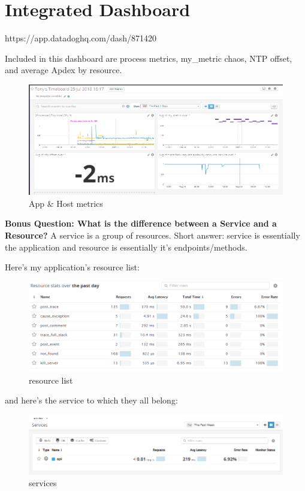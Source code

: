 \documentclass[11pt]{article}
\makeatletter
\def\maxwidth{\ifdim\Gin@nat@width>\linewidth\linewidth
    \else\Gin@nat@width\fi}
\let\Oldincludegraphics\includegraphics
\renewcommand{\includegraphics}[1]{\Oldincludegraphics[width=.8\maxwidth]{#1}}
\makeatother
\begin{document}
    \section{Integrated Dashboard}\label{integrated-dashboard}

    https://app.datadoghq.com/dash/871420

Included in this dashboard are process metrics, my\_metric chaos, NTP
offset, and average Apdex by resource.

\begin{figure}
\centering
\includegraphics{images/hostandapp.PNG}
\caption{App \& Host metrics}
\end{figure}

\textbf{Bonus Question: What is the difference between a Service and a
Resource?} A service is a group of resources. Short answer: service is
essentially the application and resource is essentially it's
endpoints/methods.

Here's my application's resource list:

\begin{figure}
\centering
\includegraphics{images/resources.png}
\caption{resource list}
\end{figure}

and here's the service to which they all belong:

\begin{figure}
\centering
\includegraphics{images/services.png}
\caption{services}
\end{figure}
\end{document}
